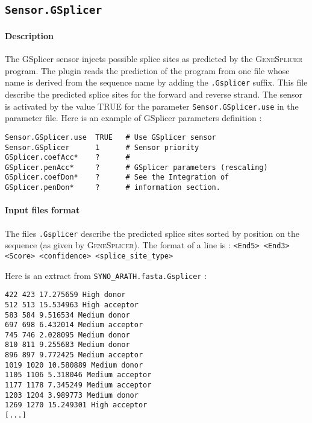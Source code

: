 
\subsection{\texttt{Sensor.GSplicer}}

\paragraph{Description}

The GSplicer sensor injects possible splice sites as predicted by the
\textsc{GeneSplicer} program. The plugin reads the prediction of the
program from one file whose name is derived from the sequence name by
adding the \texttt{.Gsplicer} suffix. This file describe the predicted
splice sites for the forward and reverse strand.  The sensor is
activated by the value TRUE for the parameter
\texttt{Sensor.GSplicer.use} in the parameter file.  Here is an
example of GSplicer parameters definition :
\begin{Verbatim}[fontsize=\small]
Sensor.GSplicer.use  TRUE   # Use GSplicer sensor
Sensor.GSplicer      1      # Sensor priority
GSplicer.coefAcc*    ?      #
GSplicer.penAcc*     ?      # GSplicer parameters (rescaling)
GSplicer.coefDon*    ?      # See the Integration of
GSplicer.penDon*     ?      # information section.
\end{Verbatim}

\paragraph{Input files format}

The files \texttt{.Gsplicer} describe the predicted splice sites
sorted by position on the sequence (as given by \textsc{GeneSplicer}).
The format of a line is : \texttt{<End5> <End3> <Score> <confidence>
  <splice\_site\_type>}

Here is an extract from \texttt{SYNO\_ARATH.fasta.Gsplicer} :
\begin{Verbatim}[fontsize=\small]
422 423 17.275659 High donor
512 513 15.534963 High acceptor
583 584 9.516534 Medium donor
697 698 6.432014 Medium acceptor
745 746 2.028095 Medium donor
810 811 9.255683 Medium donor
896 897 9.772425 Medium acceptor
1019 1020 10.580889 Medium donor
1105 1106 5.318046 Medium acceptor
1177 1178 7.345249 Medium acceptor
1203 1204 3.989773 Medium donor
1269 1270 15.249301 High acceptor
[...]
\end{Verbatim}

